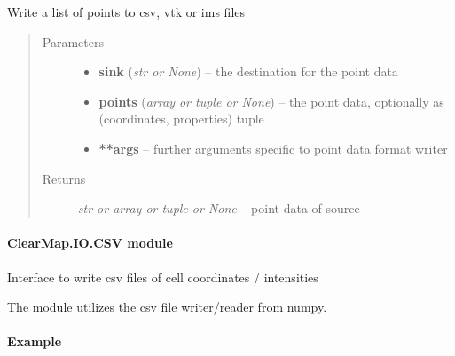 \documentclass[letterpaper,10pt,english]{sphinxmanual}
\begin{document}
\begin{fulllineitems}
\label{api/ClearMap.IO:ClearMap.IO.IO.writePoints}
Write a list of points to csv, vtk or ims files
\begin{quote}\begin{description}
\item[{Parameters}] \leavevmode\begin{itemize}
\item {} 
\textbf{sink} (\emph{str or None}) --
the destination for the point data

\item {} 
\textbf{points} (\emph{array or tuple or None}) --
the point data, optionally as (coordinates, properties) tuple

\item {} 
\textbf{**args} --
further arguments specific to point data format writer

\end{itemize}

\item[{Returns}] \leavevmode
\emph{str or array or tuple or None} --
point data of source

\end{description}\end{quote}




{\hyperref[api/ClearMap.IO:ClearMap.IO.IO.readPoints]{\emph{}}}



\end{fulllineitems}



\paragraph{ClearMap.IO.CSV module}
\label{api/ClearMap.IO:clearmap-io-csv-module}\label{api/ClearMap.IO:module-ClearMap.IO.CSV}
Interface to write csv files of cell coordinates / intensities

The module utilizes the csv file writer/reader from numpy.
\paragraph{Example}
\end{document}
